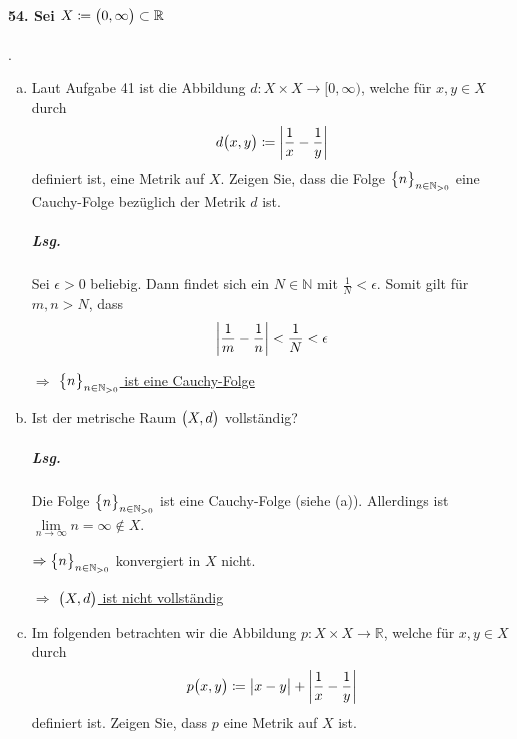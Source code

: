 \documentclass{scrreprt}
\begin{document}
\paragraph{54. Sei $X \coloneqq \qty\big(0, \infty) \subset \mathbb{R}$}.
\begin{enumerate}[(a)]
\item Laut Aufgabe 41 ist die Abbildung
  $d \colon X \times X \to \big[0, \infty \big)$, welche für $x, y \in X$
  durch
  \[
    d\qty\big(x, y) \coloneqq \abs{\frac{1}{x} - \frac{1}{y}}
  \]
  definiert ist, eine Metrik auf $X$.
  Zeigen Sie, dass die Folge $\qty\big{n}_{n \in \mathbb{N}_{> 0}}$ eine
  Cauchy-Folge bezüglich der Metrik $d$ ist.

  \subparagraph{Lsg.} Sei $\epsilon > 0$ beliebig.
  Dann findet sich ein $N \in \mathbb{N}$ mit $\frac{1}{N} < \epsilon$.
  Somit gilt für $m, n > N$, dass
  \[
    \abs{\frac{1}{m} - \frac{1}{n}} < \frac{1}{N} < \epsilon
  \]

  $\Rightarrow$ \underline{$\qty\big{n}_{n \in \mathbb{N}_{> 0}}$ ist eine
    Cauchy-Folge}

\item Ist der metrische Raum $\qty\big(X, d)$ vollständig?

  \subparagraph{Lsg.} Die Folge $\qty\big{n}_{n \in \mathbb{N}_{> 0}}$
  ist eine Cauchy-Folge (siehe (a)).
  Allerdings ist $\underset{n \to \infty}\lim n = \infty \notin X$.

  $\Rightarrow \qty\big{n}_{n \in \mathbb{N}_{> 0}}$ konvergiert in $X$ nicht.

  $\Rightarrow$ \underline{$\qty\big(X, d)$ ist nicht vollständig}

\item Im folgenden betrachten wir die Abbildung
  $p \colon X \times X \to \mathbb{R}$, welche für $x, y \in X$ durch
  \[
    p\qty\big(x, y) \coloneqq \abs\big{x - y} + \abs{\frac{1}{x} - \frac{1}{y}}
  \]
  definiert ist.
  Zeigen Sie, dass $p$ eine Metrik auf $X$ ist.


\end{enumerate}
\end{document}
